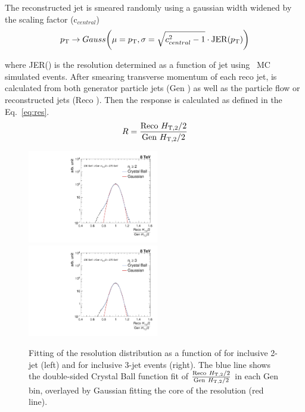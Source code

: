 The reconstructed jet \pt is smeared randomly using a gaussian width widened by the scaling factor (c$_{central}$) 
\begin{equation}
p_{\mathrm{T}} \rightarrow Gauss\bigg(\mu = p_{\mathrm{T}}, \sigma = \sqrt{c^2_{central} - 1} \cdot {\rm JER}(p_{\mathrm{T}})\bigg)
\end{equation}

where JER(\pt) is the resolution determined as a function of jet \pt using \MGP~MC simulated events. After smearing transverse momentum of each reco jet, \httwo is calculated from both generator particle jets (Gen \httwons) as well as the particle flow or reconstructed jets (Reco \httwons). Then the response is calculated as defined in the Eq.~\ref{eq:res}. 
\begin{equation}
\label{eq:res}
  R = \frac{{\rm Reco}~\httwo}{{\rm Gen}~\httwo}
\end{equation}

\begin{figure}[!htbp]
  \begin{center}
    \includegraphics[width=0.51\textwidth]{Plots_HT_2_150/Fit_Res_2_final_crystal_genbin_250-275_crystal_nomet.pdf}%
    ~~\includegraphics[width=0.51\textwidth]{Plots_HT_2_150/Fit_Res_3_final_crystal_genbin_250-275_crystal_nomet.pdf}
    \caption{Fitting of the resolution distribution as a function of \httwo for inclusive 2-jet (left) and for inclusive 3-jet events (right). The blue line shows the double-sided Crystal Ball function fit of $\frac{{\rm Reco}~\httwo}{{\rm Gen}~\httwo}$ in each Gen \httwo bin, overlayed by Gaussian fitting the core of the resolution (red line).}
    \label{fig:fit_gauss}
  \end{center}
\end{figure}

